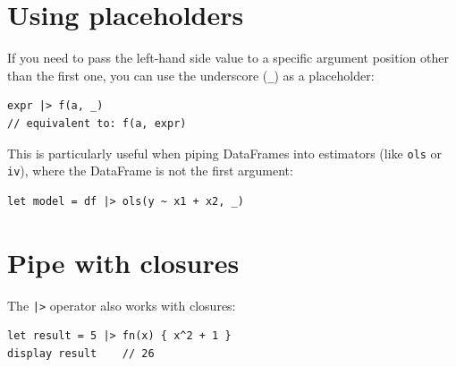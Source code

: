 \section{Using placeholders}

If you need to pass the left-hand side value to a specific argument position other than the first one, you can use the underscore (\lstinline{_}) as a placeholder:

\begin{lstlisting}
expr |> f(a, _)
// equivalent to: f(a, expr)
\end{lstlisting}

This is particularly useful when piping DataFrames into estimators (like \lstinline{ols} or \lstinline{iv}), where the DataFrame is not the first argument:

\begin{lstlisting}
let model = df |> ols(y ~ x1 + x2, _)
\end{lstlisting}

\section{Pipe with closures}

The \lstinline{|>} operator also works with closures:

\begin{lstlisting}
let result = 5 |> fn(x) { x^2 + 1 }
display result    // 26
\end{lstlisting}
